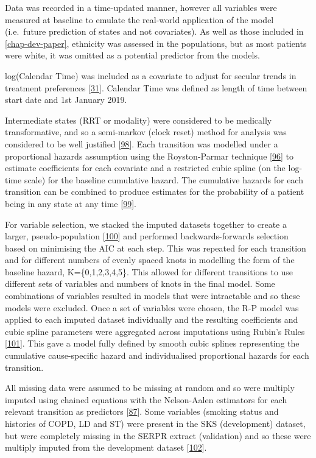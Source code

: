 \documentclass[12pt,PhD,twoside,openright]{muthesis}
\begin{document}
Data was recorded in a time-updated manner, however all variables were measured at baseline to emulate the real-world application of the model (i.e.~future prediction of states and not covariates). As well as those included in \ref{chap-dev-paper}, ethnicity was assessed in the populations, but as most patients were white, it was omitted as a potential predictor from the models.

log(Calendar Time) was included as a covariate to adjust for secular trends in treatment preferences {[}\protect\hyperlink{ref-bhatnagar_epidemiology_2015}{31}{]}. Calendar Time was defined as length of time between start date and 1st January 2019.

Intermediate states (RRT or modality) were considered to be medically transformative, and so a semi-markov (clock reset) method for analysis was considered to be well justified {[}\protect\hyperlink{ref-meira-machado_multi-state_2009}{98}{]}. Each transition was modelled under a proportional hazards assumption using the Royston-Parmar technique {[}\protect\hyperlink{ref-royston_flexible_2002}{96}{]} to estimate coefficients for each covariate and a restricted cubic spline (on the log-time scale) for the baseline cumulative hazard. The cumulative hazards for each transition can be combined to produce estimates for the probability of a patient being in any state at any time {[}\protect\hyperlink{ref-putter_tutorial_2007}{99}{]}.

For variable selection, we stacked the imputed datasets together to create a larger, pseudo-population {[}\protect\hyperlink{ref-wood_how_2008}{100}{]} and performed backwards-forwards selection based on minimising the AIC at each step. This was repeated for each transition and for different numbers of evenly spaced knots in modelling the form of the baseline hazard, K=\{0,1,2,3,4,5\}. This allowed for different transitions to use different sets of variables and numbers of knots in the final model. Some combinations of variables resulted in models that were intractable and so these models were excluded. Once a set of variables were chosen, the R-P model was applied to each imputed dataset individually and the resulting coefficients and cubic spline parameters were aggregated across imputations using Rubin's Rules {[}\protect\hyperlink{ref-rubin_multiple_1984}{101}{]}. This gave a model fully defined by smooth cubic splines representing the cumulative cause-specific hazard and individualised proportional hazards for each transition.

All missing data were assumed to be missing at random and so were multiply imputed using chained equations with the Nelson-Aalen estimators for each relevant transition as predictors {[}\protect\hyperlink{ref-white_imputing_2009}{87}{]}. Some variables (smoking status and histories of COPD, LD and ST) were present in the SKS (development) dataset, but were completely missing in the SERPR extract (validation) and so these were multiply imputed from the development dataset {[}\protect\hyperlink{ref-janssen_dealing_2009}{102}{]}.
\end{document}
